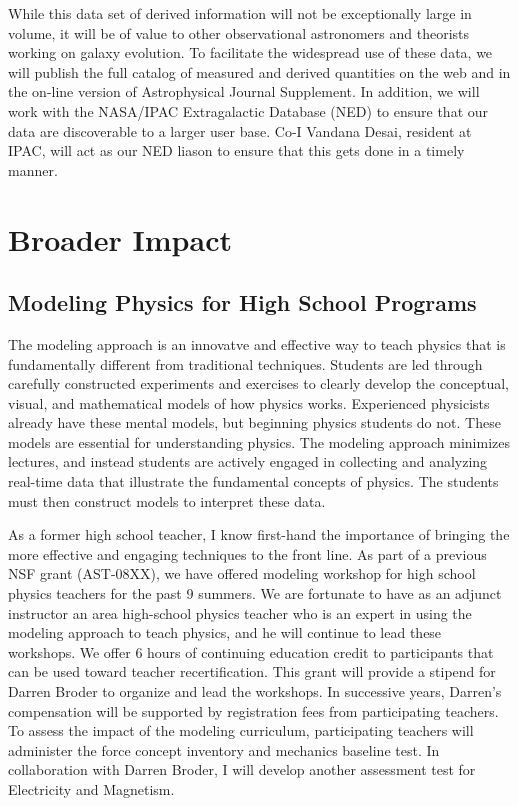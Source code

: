 \documentclass[12pt, preprint]{aastex}
\begin{document}
{While this data set of derived information will not be exceptionally
large in volume, it will be of value to other observational
astronomers and theorists working on galaxy evolution. To facilitate
the widespread use of these data, we will publish the full catalog of
measured and derived quantities on the web and in the on-line version
of Astrophysical Journal Supplement. In addition, we will work with
the NASA/IPAC Extragalactic Database (NED) to ensure that our data are
discoverable to a larger user base. Co-I Vandana Desai, resident at
IPAC, will act as our NED liason to ensure that this gets done in a
timely manner.

\vspace*{-.7cm}
\section{Broader Impact}

\vspace*{-.4cm}
\subsection{Modeling Physics for High School Programs}
\vspace*{-.4cm}
The modeling
approach is an innovatve and effective way to teach physics that is 
fundamentally different from traditional techniques.  Students are led through
carefully constructed experiments and exercises to clearly develop the conceptual, 
visual, and mathematical models of how physics works.  
Experienced physicists already have these mental models, 
but beginning physics students do not.
These models are essential for understanding physics.
The modeling approach minimizes lectures, and instead 
students are actively engaged in collecting and analyzing real-time data
that illustrate the fundamental concepts of physics.   The students must
then construct models to interpret these
data.  

As a former high school teacher, I know first-hand the importance of 
bringing the more effective and engaging techniques to the front line.
As part of a previous NSF grant (AST-08XX), we have offered 
modeling workshop for high school physics teachers for the past 9 summers.
We are fortunate
to have as an adjunct instructor an area high-school physics teacher who
is an expert in using the modeling approach to teach physics, and
he will continue to lead these workshops.  
We offer 6 hours of continuing education credit to participants 
that can be used toward teacher recertification.
This grant will provide a stipend for Darren Broder to organize and lead
the workshops.  In successive years, Darren's compensation
will be supported by registration fees from participating teachers.
To assess the impact of the modeling curriculum, participating teachers
will administer the force concept inventory and mechanics baseline test.
In collaboration with Darren Broder, I will develop another assessment 
test for Electricity and Magnetism.  

}
\end{document}
